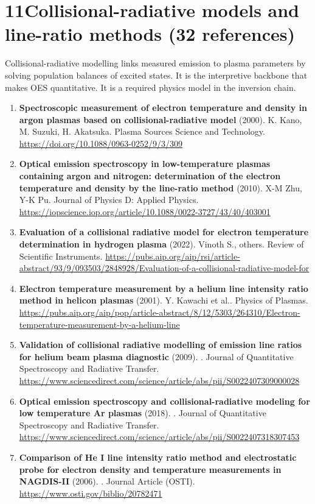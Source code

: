 \documentclass[11pt,a4paper]{article}
\begin{document}
\section*{11\quad Collisional-radiative models and line-ratio methods \textnormal{(\normalsize 32 references)}}
Collisional-radiative modelling links measured emission to plasma parameters by solving population balances of excited states. It is the interpretive backbone that makes OES quantitative. It is a required physics model in the inversion chain.
\begin{enumerate}[leftmargin=1.4em]
\item \textbf{Spectroscopic measurement of electron temperature and density in argon plasmas based on collisional-radiative model} (2000). K. Kano, M. Suzuki, H. Akatsuka. Plasma Sources Science and Technology. \url{https://doi.org/10.1088/0963-0252/9/3/309}
\item \textbf{Optical emission spectroscopy in low-temperature plasmas containing argon and nitrogen: determination of the electron temperature and density by the line-ratio method} (2010). X-M Zhu, Y-K Pu. Journal of Physics D: Applied Physics. \url{https://iopscience.iop.org/article/10.1088/0022-3727/43/40/403001}
\item \textbf{Evaluation of a collisional radiative model for electron temperature determination in hydrogen plasma} (2022). Vinoth S., others. Review of Scientific Instruments. \url{https://pubs.aip.org/aip/rsi/article-abstract/93/9/093503/2848928/Evaluation-of-a-collisional-radiative-model-for}
\item \textbf{Electron temperature measurement by a helium line intensity ratio method in helicon plasmas} (2001). Y. Kawachi et al.. Physics of Plasmas. \url{https://pubs.aip.org/aip/pop/article-abstract/8/12/5303/264310/Electron-temperature-measurement-by-a-helium-line}
\item \textbf{Validation of collisional radiative modelling of emission line ratios for helium beam plasma diagnostic} (2009). . Journal of Quantitative Spectroscopy and Radiative Transfer. \url{https://www.sciencedirect.com/science/article/abs/pii/S0022407309000028}
\item \textbf{Optical emission spectroscopy and collisional-radiative modeling for low temperature Ar plasmas} (2018). . Journal of Quantitative Spectroscopy and Radiative Transfer. \url{https://www.sciencedirect.com/science/article/abs/pii/S0022407318307453}
\item \textbf{Comparison of He I line intensity ratio method and electrostatic probe for electron density and temperature measurements in NAGDIS-II} (2006). . Journal Article (OSTI). \url{https://www.osti.gov/biblio/20782471}

\end{enumerate}
\end{document}
